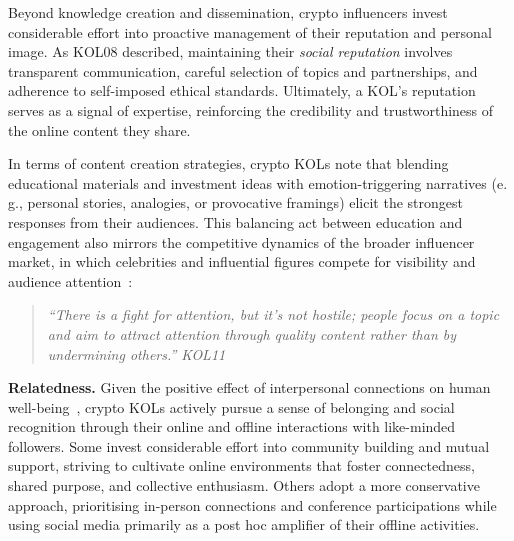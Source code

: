 Beyond knowledge creation and dissemination, crypto influencers invest considerable effort into proactive management of their reputation and personal image. As KOL08 described, maintaining their \emph{social reputation} involves  transparent communication, careful selection of topics and partnerships, and adherence to self-imposed ethical standards. Ultimately, a KOL's reputation serves as a signal of expertise, reinforcing the credibility and trustworthiness of the online content they share.

In terms of content creation strategies, crypto KOLs note that blending educational  materials and investment ideas with emotion-triggering narratives (e.\,g., personal stories, analogies, or provocative framings) elicit the strongest responses from their audiences. This balancing act between education and engagement also mirrors the competitive dynamics of the broader influencer market, in which celebrities and influential figures compete for visibility and audience attention~\cite{franck2019economy}:

\begin{quote}\itshape
``There is a fight for attention, but it's not hostile; people focus on a topic and aim to attract attention through quality content rather than by undermining others.'' 
 \textemdash{} KOL11
\end{quote}

\noindent\textbf{Relatedness.} 
Given the positive effect of interpersonal connections on human well-being~\cite{Reis2000DailyWellBeing}, crypto KOLs actively pursue a sense of belonging and social recognition through their online and offline interactions with like-minded followers. Some invest considerable effort into community building and mutual support, striving to cultivate online environments that foster connectedness, shared purpose, and collective enthusiasm. Others adopt a more conservative approach, prioritising in-person connections and conference participations while using social media primarily as a post hoc amplifier of their offline activities. 

